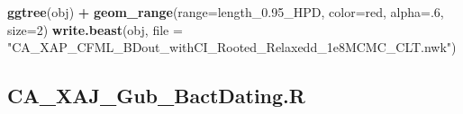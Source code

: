 \documentclass[
]{book}
\newenvironment{Shaded}{\begin{snugshade}}{\end{snugshade}}
\newcommand{\AttributeTok}[1]{\textcolor[rgb]{0.13,0.29,0.53}{#1}}
\newcommand{\DecValTok}[1]{\textcolor[rgb]{0.00,0.00,0.81}{#1}}
\newcommand{\FunctionTok}[1]{\textcolor[rgb]{0.13,0.29,0.53}{\textbf{#1}}}
\newcommand{\NormalTok}[1]{#1}
\newcommand{\SpecialCharTok}[1]{\textcolor[rgb]{0.81,0.36,0.00}{\textbf{#1}}}
\newcommand{\StringTok}[1]{\textcolor[rgb]{0.31,0.60,0.02}{#1}}
\begin{document}
\begin{Shaded}
\begin{Highlighting}[]
\FunctionTok{ggtree}\NormalTok{(obj) }\SpecialCharTok{+} \FunctionTok{geom\_range}\NormalTok{(}\AttributeTok{range=}\StringTok{\textquotesingle{}length\_0.95\_HPD\textquotesingle{}}\NormalTok{, }\AttributeTok{color=}\StringTok{\textquotesingle{}red\textquotesingle{}}\NormalTok{, }\AttributeTok{alpha=}\NormalTok{.}\DecValTok{6}\NormalTok{, }\AttributeTok{size=}\DecValTok{2}\NormalTok{)}
\FunctionTok{write.beast}\NormalTok{(obj, }\AttributeTok{file =} \StringTok{"CA\_XAP\_CFML\_BDout\_withCI\_Rooted\_Relaxedd\_1e8MCMC\_CLT.nwk"}\NormalTok{)}
\end{Highlighting}
\end{Shaded}

\subsection{CA\_XAJ\_Gub\_BactDating.R}\label{BDGUB-script}
\end{document}
